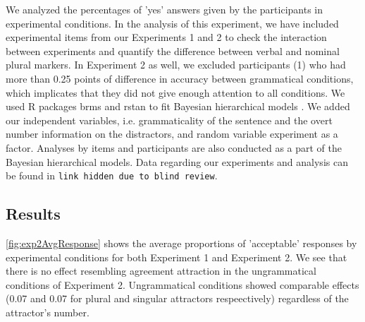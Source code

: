 \documentclass[doc,a4paper,man,natbib,floatsintext,noextraspace]{apa6}\usepackage[]{graphicx}\usepackage[]{color}
\begin{document}
We analyzed the percentages of 'yes' answers given by the participants in experimental conditions. In the analysis of this experiment, we have included experimental items from our Experiments 1 and 2 to check the interaction between experiments and quantify the difference between verbal and nominal plural markers. In Experiment 2 as well, we excluded participants (1) who had more than 0.25 points of difference in accuracy between grammatical conditions, which implicates that they did not give enough attention to all conditions. We used R packages brms \citep{R-brms_b} and rstan \citep{R-stan} to fit Bayesian hierarchical models \citep{GelmanHill:2007}. We added our independent variables, i.e. grammaticality of the sentence and the overt number information on the distractors, and random variable experiment as a factor. Analyses by items and participants are also conducted as a 
part of the Bayesian hierarchical models. Data regarding our experiments and analysis can be found in \texttt{link hidden due to blind review}.



\subsection{Results} \label{sec:exp2:results}

\autoref{fig:exp2AvgResponse} shows the average proportions of 'acceptable' responses by experimental conditions for both Experiment 1 and Experiment 2. We see that there is no effect resembling agreement attraction in the ungrammatical conditions of Experiment 2. Ungrammatical conditions showed comparable effects (0.07 and 0.07 for plural and singular attractors respeectively) regardless of the attractor's number.  
\end{document}
